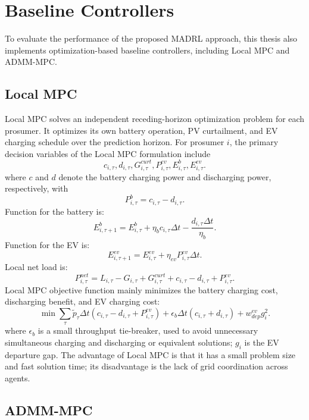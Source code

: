 \section{Baseline Controllers}

To evaluate the performance of the proposed MADRL approach, this thesis also implements optimization-based baseline controllers, including Local MPC and ADMM-MPC.

\subsection{Local MPC}

Local MPC solves an independent receding-horizon optimization problem for each prosumer. It optimizes its own battery operation, PV curtailment, and EV charging schedule over the prediction horizon. For prosumer \(i\), the primary decision variables of the Local MPC formulation include
\[
  c_{i,\tau},d_{i,\tau},G^{curt}_{i,\tau},P^{ev}_{i,\tau},E^b_{i,\tau},E^{ev}_{i,\tau}.
\]
where \(c\) and \(d\) denote the battery charging power and discharging power, respectively, with
\[
  P^b_{i,\tau}=c_{i,\tau}-d_{i,\tau}.
\]
Function for the battery is: 
\[
  E^b_{i,\tau+1}
  =
  E^b_{i,\tau}
  +
  \eta_b c_{i,\tau}\Delta t
  -
  \frac{d_{i,\tau}\Delta t}{\eta_b}.
\]
Function for the EV is:
\[
  E^{ev}_{i,\tau+1}
  =
  E^{ev}_{i,\tau}
  +
  \eta_{ev}P^{ev}_{i,\tau}\Delta t.
\]
Local net load is:
\[
  P^{net}_{i,\tau}
  =
  L_{i,\tau}-G_{i,\tau}+G^{curt}_{i,\tau}
  +c_{i,\tau}-d_{i,\tau}
  +P^{ev}_{i,\tau}.
\]
Local MPC objective function mainly minimizes the battery charging cost, discharging benefit, and EV charging cost:
\[
  \min
  \sum_{\tau}
  \tilde p_{\tau}\Delta t
  (c_{i,\tau}-d_{i,\tau}+P^{ev}_{i,\tau})
  +
  \epsilon_b\Delta t(c_{i,\tau}+d_{i,\tau})
  +
  w^{ev}_{dep}g_i^2.
\]
where \(\epsilon_b\) is a small throughput tie-breaker, used to avoid unnecessary simultaneous charging and discharging or equivalent solutions; \(g_i\) is the EV departure gap. The advantage of Local MPC is that it has a small problem size and fast solution time; its disadvantage is the lack of grid coordination across agents.

\subsection{ADMM-MPC}

